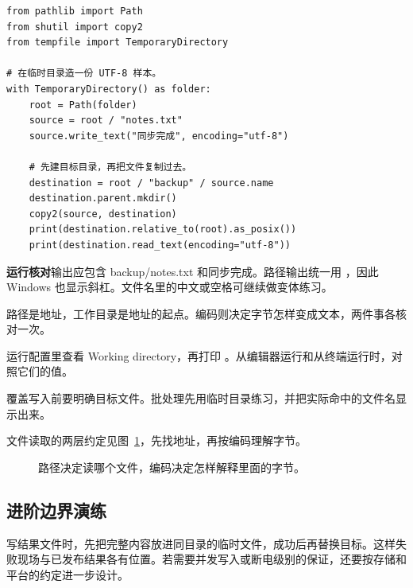 \documentclass[UTF8,a4paper,oneside,openany,fontset=none,11pt]{ctexbook}
\newcommand{\code}[1]{\texttt{\detokenize{#1}}}
\begin{document}
\begin{lstlisting}[title={\code{copy_note.py}}]
from pathlib import Path
from shutil import copy2
from tempfile import TemporaryDirectory

# 在临时目录造一份 UTF-8 样本。
with TemporaryDirectory() as folder:
    root = Path(folder)
    source = root / "notes.txt"
    source.write_text("同步完成", encoding="utf-8")

    # 先建目标目录，再把文件复制过去。
    destination = root / "backup" / source.name
    destination.parent.mkdir()
    copy2(source, destination)
    print(destination.relative_to(root).as_posix())
    print(destination.read_text(encoding="utf-8"))
\end{lstlisting}

\textbf{运行核对}\enspace 输出应包含 backup/notes.txt 和同步完成。路径输出统一用 \code{as_posix()}，因此 Windows 也显示斜杠。文件名里的中文或空格可继续做变体练习。

\begin{myunderstanding}
路径是地址，工作目录是地址的起点。编码则决定字节怎样变成文本，两件事各核对一次。
\end{myunderstanding}

\begin{pycharmpractice}
运行配置里查看 Working directory，再打印 \code{Path.cwd()}。从编辑器运行和从终端运行时，对照它们的值。
\end{pycharmpractice}

\begin{pitfall}
覆盖写入前要明确目标文件。批处理先用临时目录练习，并把实际命中的文件名显示出来。
\end{pitfall}
文件读取的两层约定见图~\ref{fig:chapter-9-flow}，先找地址，再按编码理解字节。
\begin{figure}[htbp]
  \centering
  \caption{路径决定读哪个文件，编码决定怎样解释里面的字节。}
  \label{fig:chapter-9-flow}
\end{figure}

\subsection*{进阶边界演练}
写结果文件时，先把完整内容放进同目录的临时文件，成功后再替换目标。这样失败现场与已发布结果各有位置。若需要并发写入或断电级别的保证，还要按存储和平台的约定进一步设计。
\end{document}
